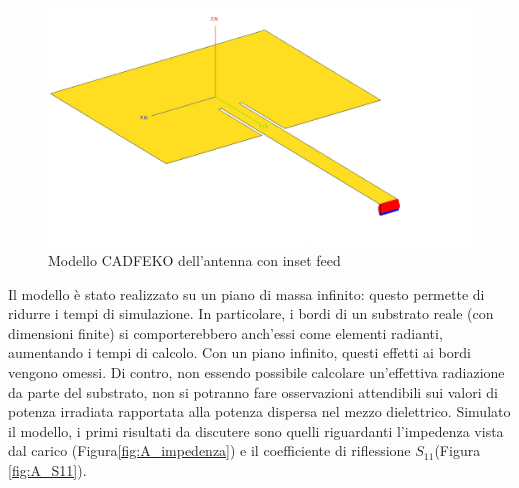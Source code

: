 \documentclass[twoside,twocolumn]{article}
\begin{document}
\begin{figure}[h!]
  \includegraphics[width=\linewidth]{A_Cad.jpg}
  \caption{Modello CADFEKO dell'antenna con inset feed}
  \label{fig:A_Cad}
\end{figure}
Il modello è stato realizzato su un piano di massa infinito: questo permette di ridurre i tempi di simulazione. In particolare, i bordi di un substrato reale (con dimensioni finite) si comporterebbero anch'essi come elementi radianti, aumentando i tempi  di calcolo.
Con un piano infinito, questi effetti ai bordi vengono omessi. Di contro, non essendo possibile calcolare un'effettiva radiazione da parte del substrato, non si potranno fare osservazioni attendibili sui valori di potenza irradiata rapportata alla potenza dispersa nel mezzo dielettrico.\newline \newline
Simulato il modello, i primi risultati da discutere sono quelli riguardanti l'impedenza vista dal carico (Figura\ref{fig:A_impedenza}) e il coefficiente di riflessione $S_{11}$(Figura  \ref{fig:A_S11}).
\end{document}
